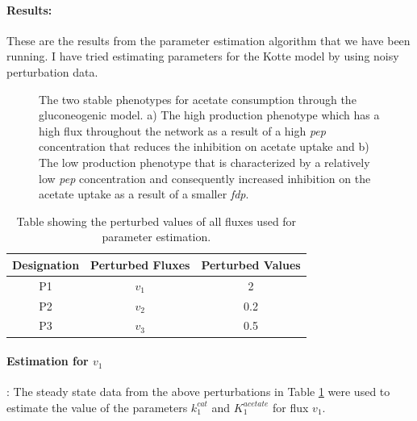 \documentclass[10pt]{report}
\begin{document}
	\paragraph{Results:}
	These are the results from the parameter estimation algorithm that we have been running. I have tried estimating parameters for the Kotte model by using noisy perturbation data.
	
	\begin{figure}[!h]%
		\caption{The two stable phenotypes for acetate consumption through the gluconeogenic model. a) The high production phenotype which has a high flux throughout the network as a result of a high \textit{pep} concentration that reduces the inhibition on acetate uptake and b) The low production phenotype that is characterized by a relatively low \textit{pep} concentration and consequently increased inhibition on the acetate uptake as a result of a smaller \textit{fdp}.}\label{fig:fig1}
	\end{figure}

	\begin{table}[!tbhp]
		\caption{Table showing the perturbed values of all fluxes used for parameter estimation.}
		\begin{center}				
			\begin{tabular}{ccc}
				Designation & Perturbed Fluxes & Perturbed Values\\
				\hline
				P1 & $v_1$ & 2\\
				P2 & $v_2$ & 0.2\\
				P3 & $v_3$ & 0.5
			\end{tabular}
		\end{center}	
	\label{tab:pval}
	\end{table}
	
	\paragraph{Estimation for $v_1$}: The steady state data from the above perturbations in Table \ref{tab:pval} were used to estimate the value of the parameters $k_1^{cat}$ and $K_1^{acetate}$ for flux $v_1$.
	
\end{document}
